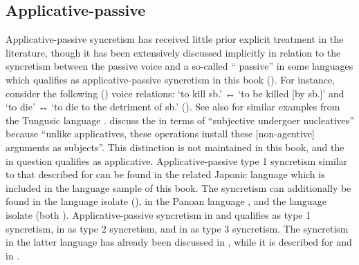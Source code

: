\subsection{Applicative-passive} \label{sec:simple-syncretism:appl-pass}
Applicative-passive syncretism has received little prior explicit treatment in the literature, though it has been extensively discussed implicitly in relation to the syncretism between the passive voice and a so-called “ passive” in some languages which qualifies as applicative-passive syncretism in this book (). For instance, consider the following  () voice relations:  ‘to kill sb.’ ↔  ‘to be killed [by sb.]’ and  ‘to die’ ↔  ‘to die to the detriment of sb.’ (\citealt[244]{zuniga:kittila:2019}). See also \citet[608f.]{malchukov:nedjalkov:2015} for similar examples from the Tungusic language . \citet[81]{zuniga:kittila:2019} discuss the   in terms of “subjective undergoer nucleatives” because “unlike applicatives, these operations install these [non-agentive] arguments as subjects”. This distinction is not maintained in this book, and the   in question qualifies as applicative. Applicative-passive type 1 syncretism similar to that described for  can be found in the related Japonic language  which is included in the language sample of this book. The syncretism can additionally be found in the language isolate  (), in the Panoan language , and the language isolate  (both ). Applicative-passive syncretism in  and  qualifies as type 1 syncretism, in  as type 2 syncretism, and in  as type 3 syncretism. The syncretism in the latter language has already been discussed in , while it is described for  and  in .



